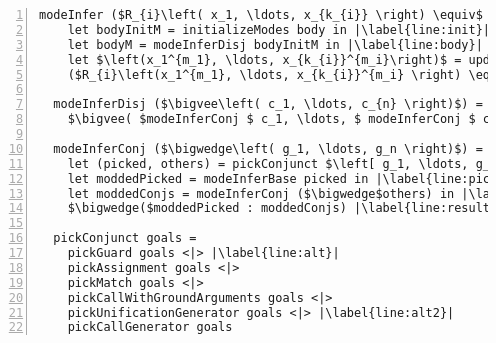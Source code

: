 


\begin{figure*}[t]
  \centering
  \begin{minipage}{0.55\textwidth}
    \begin{lstlisting}[label={fig:modeInference},
                       caption={Mode inference pseudocode},
                       captionpos=b,
                       frame=tb,
                       escapechar=|,
                       numbers=left,
                       numberstyle={\footnotesize}]
  modeInfer ($R_{i}\left( x_1, \ldots, x_{k_{i}} \right) \equiv$ body) =
    let bodyInitM = initializeModes body in |\label{line:init}| 
    let bodyM = modeInferDisj bodyInitM in |\label{line:body}|
    let $\left(x_1^{m_1}, \ldots, x_{k_{i}}^{m_i}\right)$ = updateModes($\left(x_1, \ldots, x_{k_{i}}\right)$, bodyM) |\label{line:modeUpd}|
    ($R_{i}\left(x_1^{m_1}, \ldots, x_{k_{i}}^{m_i} \right) \equiv$ moddedBody) 
  
  modeInferDisj ($\bigvee\left( c_1, \ldots, c_{n} \right)$) =
    $\bigvee( $modeInferConj $ c_1, \ldots, $ modeInferConj $ c_{n})$ |\label{line:disj}|
  
  modeInferConj ($\bigwedge\left( g_1, \ldots, g_n \right)$) =
    let (picked, others) = pickConjunct $\left[ g_1, \ldots, g_n \right]$ in |\label{line:pick}|
    let moddedPicked = modeInferBase picked in |\label{line:pick_analyze}|
    let moddedConjs = modeInferConj ($\bigwedge$others) in |\label{line:conj}|
    $\bigwedge($moddedPicked : moddedConjs) |\label{line:result}|
  
  pickConjunct goals =
    pickGuard goals <|> |\label{line:alt}|
    pickAssignment goals <|>
    pickMatch goals <|>
    pickCallWithGroundArguments goals <|>
    pickUnificationGenerator goals <|> |\label{line:alt2}|
    pickCallGenerator goals
    \end{lstlisting}
  \end{minipage}
\end{figure*}